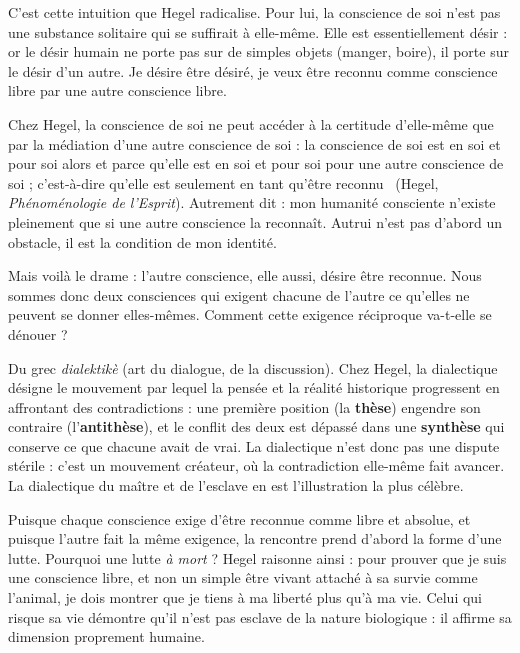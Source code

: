 \documentclass[11pt]{article}
\newcommand{\cle}[1]{{\popxbold\color{popdark}#1}}
\newcounter{popsec}
\newcounter{popsub}
\newcommand{\courssub}[1]{%
  \stepcounter{popsub}%
  \par\vspace{9pt}\noindent{\popxbold\fontsize{11.5}{13}\selectfont\color{popink}{\color{poporange}\thepopsec.\thepopsub}\hspace{6pt}#1}\par\nopagebreak\vspace{4pt}
}
\begin{document}
C'est cette intuition que Hegel radicalise. Pour lui, la conscience de soi n'est pas une substance solitaire qui se suffirait à elle-même. Elle est essentiellement \cle{désir} : or le désir humain ne porte pas sur de simples objets (manger, boire), il porte sur le désir d'un autre. Je désire être désiré, je veux être reconnu comme conscience libre par une autre conscience libre.

\begin{propriete}
Chez Hegel, la conscience de soi ne peut accéder à la certitude d'elle-même que par la médiation d'une autre conscience de soi : \guillemotleft la conscience de soi est en soi et pour soi alors et parce qu'elle est en soi et pour soi pour une autre conscience de soi ; c'est-à-dire qu'elle est seulement en tant qu'être reconnu \guillemotright\ (Hegel, \emph{Phénoménologie de l'Esprit}). Autrement dit : mon humanité consciente n'existe pleinement que si une autre conscience la reconnaît. Autrui n'est pas d'abord un obstacle, il est la condition de mon identité.
\end{propriete}

Mais voilà le drame : l'autre conscience, elle aussi, désire être reconnue. Nous sommes donc deux consciences qui exigent chacune de l'autre ce qu'elles ne peuvent se donner elles-mêmes. Comment cette exigence réciproque va-t-elle se dénouer ?

\begin{definition}[La dialectique]
Du grec \emph{dialektikè} (art du dialogue, de la discussion). Chez Hegel, la \cle{dialectique} désigne le mouvement par lequel la pensée et la réalité historique progressent en affrontant des contradictions : une première position (la \textbf{thèse}) engendre son contraire (l'\textbf{antithèse}), et le conflit des deux est dépassé dans une \textbf{synthèse} qui conserve ce que chacune avait de vrai. La dialectique n'est donc pas une dispute stérile : c'est un mouvement créateur, où la contradiction elle-même fait avancer. La dialectique du maître et de l'esclave en est l'illustration la plus célèbre.
\end{definition}

\courssub{La lutte à mort pour la reconnaissance}

Puisque chaque conscience exige d'être reconnue comme libre et absolue, et puisque l'autre fait la même exigence, la rencontre prend d'abord la forme d'une \cle{lutte}. Pourquoi une lutte \emph{à mort} ? Hegel raisonne ainsi : pour prouver que je suis une conscience libre, et non un simple être vivant attaché à sa survie comme l'animal, je dois montrer que je tiens à ma liberté plus qu'à ma vie. Celui qui risque sa vie démontre qu'il n'est pas esclave de la nature biologique : il affirme sa dimension proprement humaine.
\end{document}
